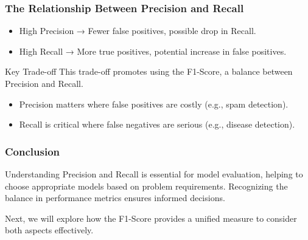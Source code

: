 \documentclass[aspectratio=169]{beamer}
\begin{document}
\begin{frame}[fragile]
    \frametitle{The Relationship Between Precision and Recall}
    
    \begin{itemize}
        \item High Precision → Fewer false positives, possible drop in Recall.
        \item High Recall → More true positives, potential increase in false positives.
    \end{itemize}
    
    \begin{block}{Key Trade-off}
        This trade-off promotes using the F1-Score, a balance between Precision and Recall.
    \end{block}
    
    \begin{itemize}
        \item Precision matters where false positives are costly (e.g., spam detection).
        \item Recall is critical where false negatives are serious (e.g., disease detection).
    \end{itemize}
\end{frame}

\begin{frame}[fragile]
    \frametitle{Conclusion}
    
    Understanding Precision and Recall is essential for model evaluation, helping to choose appropriate models based on problem requirements. Recognizing the balance in performance metrics ensures informed decisions.
    
    Next, we will explore how the F1-Score provides a unified measure to consider both aspects effectively.
\end{frame}
\end{document}

